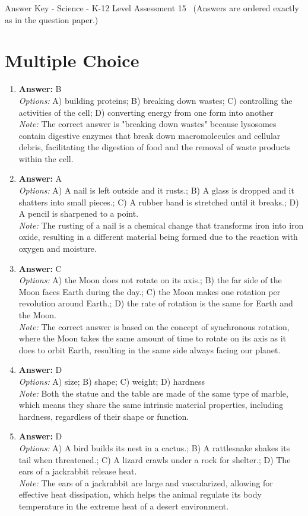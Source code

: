 \documentclass[12pt]{article}
\begin{document}
\begin{center}
Answer Key - Science - K-12 Level Assessment 15 \
\small (Answers are ordered exactly as in the question paper.)
\end{center}

\section*{Multiple Choice}
\begin{enumerate}[label=\arabic*.]
\item \textbf{Answer:} B
\\ \textit{Options:} A) building proteins; B) breaking down wastes; C) controlling the activities of the cell; D) converting energy from one form into another
\\ \textit{Note:} The correct answer is "breaking down wastes" because lysosomes contain digestive enzymes that break down macromolecules and cellular debris, facilitating the digestion of food and the removal of waste products within the cell.
\item \textbf{Answer:} A
\\ \textit{Options:} A) A nail is left outside and it rusts.; B) A glass is dropped and it shatters into small pieces.; C) A rubber band is stretched until it breaks.; D) A pencil is sharpened to a point.
\\ \textit{Note:} The rusting of a nail is a chemical change that transforms iron into iron oxide, resulting in a different material being formed due to the reaction with oxygen and moisture.
\item \textbf{Answer:} C
\\ \textit{Options:} A) the Moon does not rotate on its axis.; B) the far side of the Moon faces Earth during the day.; C) the Moon makes one rotation per revolution around Earth.; D) the rate of rotation is the same for Earth and the Moon.
\\ \textit{Note:} The correct answer is based on the concept of synchronous rotation, where the Moon takes the same amount of time to rotate on its axis as it does to orbit Earth, resulting in the same side always facing our planet.
\item \textbf{Answer:} D
\\ \textit{Options:} A) size; B) shape; C) weight; D) hardness
\\ \textit{Note:} Both the statue and the table are made of the same type of marble, which means they share the same intrinsic material properties, including hardness, regardless of their shape or function.
\item \textbf{Answer:} D
\\ \textit{Options:} A) A bird builds its nest in a cactus.; B) A rattlesnake shakes its tail when threatened.; C) A lizard crawls under a rock for shelter.; D) The ears of a jackrabbit release heat.
\\ \textit{Note:} The ears of a jackrabbit are large and vascularized, allowing for effective heat dissipation, which helps the animal regulate its body temperature in the extreme heat of a desert environment.
\end{enumerate}
\end{document}
